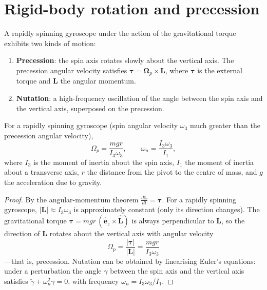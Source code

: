 \section{Rigid-body rotation and precession}

\begin{definition}\label{def:gyroscope}
A rapidly spinning gyroscope under the action of the gravitational torque exhibits two kinds of motion:
\begin{enumerate}[label=(\roman*)]
    \item \textbf{Precession}: the spin axis rotates slowly about the vertical axis. The precession angular velocity satisfies $\boldsymbol{\tau} = \boldsymbol{\Omega}_p \times \mathbf{L}$, where $\boldsymbol{\tau}$ is the external torque and $\mathbf{L}$ the angular momentum.
    \item \textbf{Nutation}: a high-frequency oscillation of the angle between the spin axis and the vertical axis, superposed on the precession.
\end{enumerate}
\end{definition}

\begin{proposition}\label{prop:precession_nutation}
For a rapidly spinning gyroscope (spin angular velocity $\omega_3$ much greater than the precession angular velocity),
\[
\Omega_p = \frac{mgr}{I_3\omega_3}, \qquad \omega_n = \frac{I_3\omega_3}{I_1},
\]
where $I_3$ is the moment of inertia about the spin axis, $I_1$ the moment of inertia about a transverse axis, $r$ the distance from the pivot to the centre of mass, and $g$ the acceleration due to gravity.
\end{proposition}

\begin{proof}
By the angular-momentum theorem $\frac{d\mathbf{L}}{dt} = \boldsymbol{\tau}$. For a rapidly spinning gyroscope, $|\mathbf{L}| \approx I_3\omega_3$ is approximately constant (only its direction changes). The gravitational torque $\boldsymbol{\tau} = mgr\,(\hat{\mathbf{e}}_z \times \hat{\mathbf{L}})$ is always perpendicular to $\mathbf{L}$, so the direction of $\mathbf{L}$ rotates about the vertical axis with angular velocity
\[
\Omega_p = \frac{|\boldsymbol{\tau}|}{|\mathbf{L}|} = \frac{mgr}{I_3\omega_3}
\]
---that is, precession. Nutation can be obtained by linearising Euler's equations: under a perturbation the angle $\gamma$ between the spin axis and the vertical axis satisfies $\ddot\gamma + \omega_n^2 \gamma = 0$, with frequency $\omega_n = I_3\omega_3/I_1$.
\end{proof}

